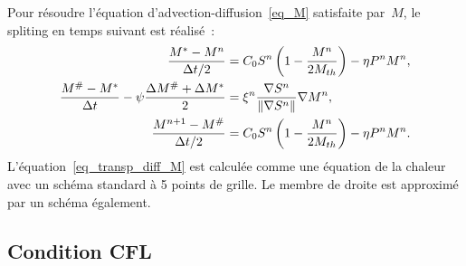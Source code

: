 \documentclass[main.tex]{subfiles}
\begin{document}
Pour résoudre l'équation d'advection-diffusion~\eqref{eq_M}
satisfaite par~$M$, le spliting en temps suivant est réalisé~:
\begin{align}
\dfrac{M^*-M^n}{\Delta t/2} &= C_0 S^n \left( 1-\dfrac{M^n}{2\Ms}\right) - \eta P^nM^n, %
\\
\dfrac{M^{\#}-M^*}{\Delta t} - \psi \dfrac{ \Delta M^\# + \Delta M^*}{2} &= \xi^n  \dfrac{\nabla S^n}{\| \nabla S^n \| }\nabla M^n, %
\label{eq_transp_diff_M}\\
\dfrac{M^{n+1}-M^\#}{\Delta t/2} &= C_0 S^n \left( 1-\dfrac{M^n}{2\Ms}\right) - \eta P^nM^n. \label{eq_snd_membre_M}
\end{align}
L'équation~\eqref{eq_transp_diff_M} est calculée comme une équation de la chaleur avec un schéma standard à 5 points de grille. Le membre de droite est approximé par un schéma  \twinweno également.


\subsection{Condition CFL}
\end{document}
